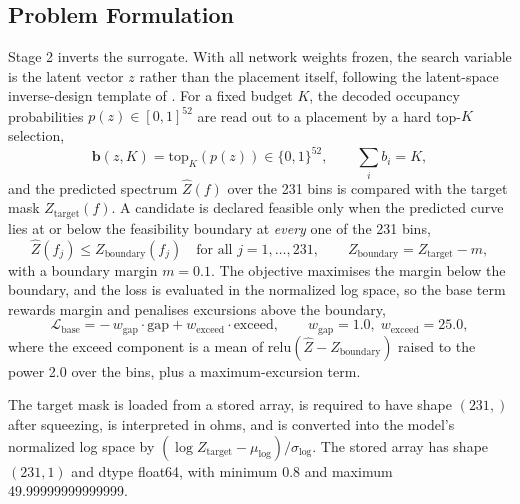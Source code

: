 \subsection{Problem Formulation}
\label{subsec:opt_problem_formulation}

Stage 2 inverts the surrogate. With all network weights frozen, the search variable is the latent
vector $z$ rather than the placement itself, following the latent-space inverse-design template of
\cite{gomezbombarelli2018automatic}. For a fixed budget $K$, the decoded occupancy probabilities
$p(z) \in [0,1]^{52}$ are read out to a placement by a hard top-$K$ selection,
\begin{equation}
\mathbf{b}(z, K) = \mathrm{top}_K\!\left(p(z)\right) \in \{0,1\}^{52},
\qquad \sum_{i} b_i = K ,
\label{eq:topk_readout}
\end{equation}
and the predicted spectrum $\hat{Z}(f)$ over the 231 bins is compared with the target mask
$Z_{\mathrm{target}}(f)$. A candidate is declared feasible only when the predicted curve lies at or
below the feasibility boundary at \emph{every} one of the 231 bins,
\begin{equation}
\hat{Z}(f_j) \le Z_{\mathrm{boundary}}(f_j) \quad \text{for all } j = 1,\dots,231,
\qquad
Z_{\mathrm{boundary}} = Z_{\mathrm{target}} - m,
\label{eq:feasibility_design}
\end{equation}
with a boundary margin $m = 0.1$. The objective maximises the margin below the boundary, and the loss
is evaluated in the normalized log space, so the base term rewards margin and penalises excursions
above the boundary,
\begin{equation}
\mathcal{L}_{\mathrm{base}}
= -\,w_{\mathrm{gap}} \cdot \mathrm{gap}
+ w_{\mathrm{exceed}} \cdot \mathrm{exceed},
\qquad
w_{\mathrm{gap}} = 1.0, \; w_{\mathrm{exceed}} = 25.0 ,
\label{eq:stage2_base}
\end{equation}
where the exceed component is a mean of $\mathrm{relu}(\hat{Z} - Z_{\mathrm{boundary}})$ raised to
the power 2.0 over the bins, plus a maximum-excursion term.

The target mask is loaded from a stored array, is required to have shape $(231,)$ after squeezing, is
interpreted in ohms, and is converted into the model's normalized log space by
$(\log Z_{\mathrm{target}} - \mu_{\log}) / \sigma_{\log}$. The stored array has shape $(231, 1)$ and
dtype float64, with minimum 0.8 and maximum 49.99999999999999.

